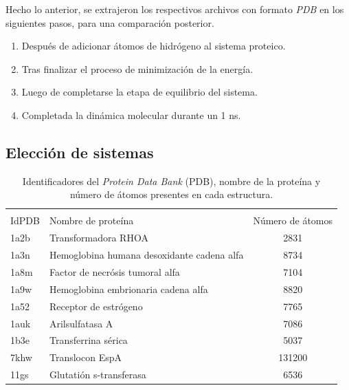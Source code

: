 	
 	\clearpage
 	
 	Hecho lo anterior, se extrajeron los respectivos archivos con formato \textit{PDB} en 
 	los siguientes pasos, para una comparaci\'{o}n posterior.
 	
 	\begin{enumerate}
 		\item Despu\'{e}s de adicionar \'{a}tomos de hidr\'{o}geno al sistema proteico. 
 		\item Tras finalizar el proceso de minimizaci\'{o}n de la energ\'{i}a.
 		\item Luego de completarse la etapa de equilibrio del sistema.
 		\item Completada la din\'{a}mica molecular durante un 1 ns.
 	\end{enumerate}
 	
 	
 	\subsection{Elecci\'{o}n de sistemas}
 	
 	\begin{table}[h!]
 		\centering
 		\begin{tabular}{llc}
 			\multicolumn{3}{c}{} \\ 
 			IdPDB & Nombre de prote\'{i}na & N\'{u}mero de \'{a}tomos \\
 			\hline
 			1a2b & Transformadora RHOA & 2831 \\
 			1a3n & Hemoglobina humana desoxidante cadena alfa & 8734 \\
 			1a8m & Factor de necr\'{o}sis tumoral alfa & 7104 \\
 			1a9w & Hemoglobina embrionaria cadena alfa & 8820 \\
 			1a52 & Receptor de estr\'{o}geno & 7765 \\
 			1auk & Arilsulfatasa A & 7086 \\
 			1b3e & Transferrina s\'{e}rica & 5037 \\
 			7khw & Translocon EspA & 131200 \\
 			11gs & Glutati\'{o}n s-transferasa & 6536 \\ 
 			\hline
 		\end{tabular}
 		\caption{Identificadores del \emph{Protein Data Bank} (PDB), nombre de la prote\'{i}na y n\'{u}mero de \'{a}tomos presentes en cada estructura.}
 		\label{Tabla:ids}
 	\end{table}
 	
 	
 	
